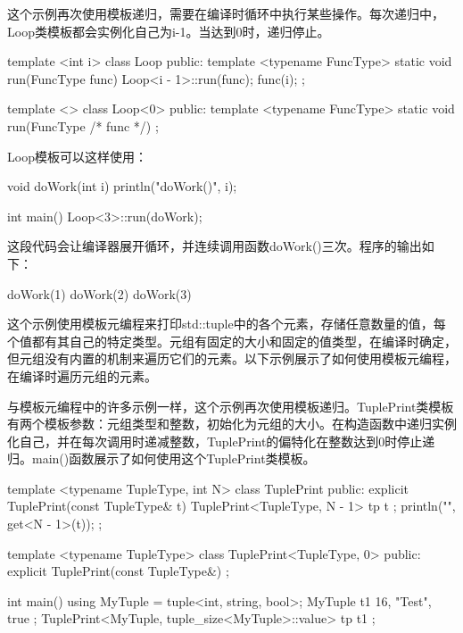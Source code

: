 这个示例再次使用模板递归，需要在编译时循环中执行某些操作。每次递归中，Loop类模板都会实例化自己为i-1。当达到0时，递归停止。

\begin{cpp}
template <int i>
class Loop
{
    public:
        template <typename FuncType>
        static void run(FuncType func) {
            Loop<i - 1>::run(func);
            func(i);
        }
};

template <>
class Loop<0>
{
    public:
        template <typename FuncType>
        static void run(FuncType /* func */) { }
};
\end{cpp}

Loop模板可以这样使用：

\begin{cpp}
void doWork(int i) { println("doWork({})", i); }

int main()
{
    Loop<3>::run(doWork);
}
\end{cpp}

这段代码会让编译器展开循环，并连续调用函数doWork()三次。程序的输出如下：

\begin{shell}
doWork(1)
doWork(2)
doWork(3)
\end{shell}


这个示例使用模板元编程来打印std::tuple中的各个元素，存储任意数量的值，每个值都有其自己的特定类型。元组有固定的大小和固定的值类型，在编译时确定，但元组没有内置的机制来遍历它们的元素。以下示例展示了如何使用模板元编程，在编译时遍历元组的元素。

与模板元编程中的许多示例一样，这个示例再次使用模板递归。TuplePrint类模板有两个模板参数：元组类型和整数，初始化为元组的大小。在构造函数中递归实例化自己，并在每次调用时递减整数，TuplePrint的偏特化在整数达到0时停止递归。main()函数展示了如何使用这个TuplePrint类模板。

\begin{cpp}
template <typename TupleType, int N>
class TuplePrint
{
    public:
        explicit TuplePrint(const TupleType& t) {
            TuplePrint<TupleType, N - 1> tp { t };
            println("{}", get<N - 1>(t));
        }
};

template <typename TupleType>
class TuplePrint<TupleType, 0>
{
    public:
        explicit TuplePrint(const TupleType&) { }
};

int main()
{
    using MyTuple = tuple<int, string, bool>;
    MyTuple t1 { 16, "Test", true };
    TuplePrint<MyTuple, tuple_size<MyTuple>::value> tp { t1 };
}
\end{cpp}

